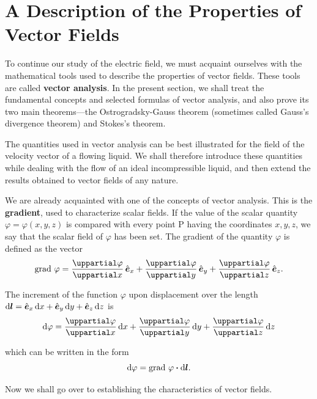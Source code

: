 \section{A Description of the Properties of Vector Fields}\label{sec:1_11}

To continue our study of the electric field, we must acquaint ourselves with the mathematical tools used to describe the properties of vector fields. These tools are called \textbf{vector analysis}. In the present section, we shall treat the fundamental concepts and selected formulas of vector analysis, and also prove its two main theorems---the Ostrogradsky-Gauss theorem (sometimes called Gauss's divergence theorem) and Stokes's theorem.

The quantities used in vector analysis can be best illustrated for the field of the velocity vector of a flowing liquid. We shall therefore introduce these quantities while dealing with the flow of an ideal incompressible liquid, and then extend the results obtained to vector fields of any nature.

We are already acquainted with one of the concepts of vector analysis. This is the \textbf{gradient}, used to characterize scalar fields. If the value of the scalar quantity $\varphi=\varphi(x, y, z)$ is compared with every point P having the coordinates $x, y, z$, we say that the scalar field of $\varphi$ has been set. The gradient of the quantity $\varphi$ is defined as the vector
\begin{equation}\label{eq:1_68}
	\grad{\varphi} = \diffpartial{\varphi}{x}\,\vecuni{x} + \diffpartial{\varphi}{y}\,\vecuni{y} + \diffpartial{\varphi}{z}\,\vecuni{z}.
\end{equation}

The increment of the function $\varphi$ upon displacement over the length $\mathrm{d}\boldsymbol{l}=\hat{\boldsymbol{e}}_{x}\,\mathrm{d} x+\hat{\boldsymbol{e}}_{y}\,\mathrm{d} y+\hat{\boldsymbol{e}}_{z}\,\mathrm{d} z$ is
\begin{equation*}
	\deriv{\varphi} = \diffpartial{\varphi}{x}\,\deriv{x} + \diffpartial{\varphi}{y}\,\deriv{y} + \diffpartial{\varphi}{z}\,\deriv{z}
\end{equation*}

\noindent
which can be written in the form
\begin{equation}\label{eq:1_69}
	\mathrm{d}\varphi = \text{grad~}\varphi \boldsymbol{\cdot} \mathrm{d}\boldsymbol{l}.
\end{equation}

Now we shall go over to establishing the characteristics of vector fields.

